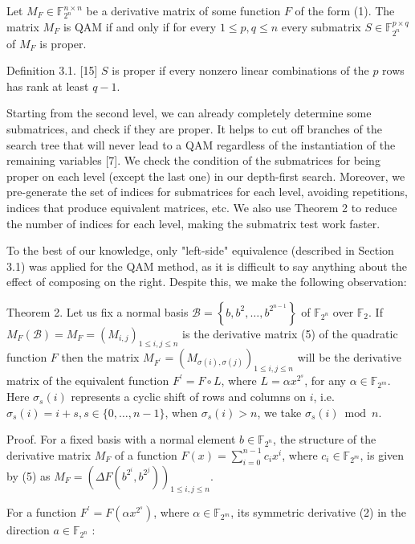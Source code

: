 \documentclass[10pt]{article}
\begin{document}
Let $M_{F} \in \mathbb{F}_{2^{n}}^{n \times n}$ be a derivative matrix of some function $F$ of the form (1). The matrix $M_{F}$ is QAM if and only if for every $1 \leq p, q \leq n$ every submatrix $S \in \mathbb{F}_{2^{n}}^{p \times q}$ of $M_{F}$ is proper.

Definition 3.1. [15] $S$ is proper if every nonzero linear combinations of the $p$ rows has rank at least $q-1$.

Starting from the second level, we can already completely determine some submatrices, and check if they are proper. It helps to cut off branches of the search tree that will never lead to a QAM regardless of the instantiation of the remaining variables [7]. We check the condition of the submatrices for being proper on each level (except the last one) in our depth-first search. Moreover, we pre-generate the set of indices for submatrices for each level, avoiding repetitions, indices that produce equivalent matrices, etc. We also use Theorem 2 to reduce the number of indices for each level, making the submatrix test work faster.

To the best of our knowledge, only "left-side" equivalence (described in Section 3.1) was applied for the QAM method, as it is difficult to say anything about the effect of composing on the right. Despite this, we make the following observation:

Theorem 2. Let us fix a normal basis $\mathcal{B}=\left\{b, b^{2}, \ldots, b^{2^{n-1}}\right\}$ of $\mathbb{F}_{2^{n}}$ over $\mathbb{F}_{2}$. If $M_{F}(\mathcal{B})=M_{F}= \left(M_{i, j}\right)_{1 \leq i, j \leq n}$ is the derivative matrix (5) of the quadratic function $F$ then the matrix $M_{F^{\prime}}= \left(M_{\sigma(i), \sigma(j)}\right)_{1 \leq i, j \leq n}$ will be the derivative matrix of the equivalent function $F^{\prime}=F \circ L$, where $L= \alpha x^{2^{s}}$, for any $\alpha \in \mathbb{F}_{2^{m}}$. Here $\sigma_{s}(i)$ represents a cyclic shift of rows and columns on $i$, i.e. $\sigma_{s}(i)= i+s, s \in\{0, \ldots, n-1\}$, when $\sigma_{s}(i)>n$, we take $\sigma_{s}(i) \bmod n$.

Proof. For a fixed basis with a normal element $b \in \mathbb{F}_{2^{n}}$, the structure of the derivative matrix $M_{F}$ of a function $F(x)=\sum_{i=0}^{n-1} c_{i} x^{i}$, where $c_{i} \in \mathbb{F}_{2^{m}}$, is given by (5) as $M_{F}=\left(\Delta F\left(b^{2^{i}}, b^{2^{j}}\right)\right)_{1 \leq i, j \leq n}$.

For a function $F^{\prime}=F\left(\alpha x^{2^{s}}\right)$, where $\alpha \in \mathbb{F}_{2^{m}}$, its symmetric derivative (2) in the direction $a \in \mathbb{F}_{2^{n}}$ :
\end{document}
